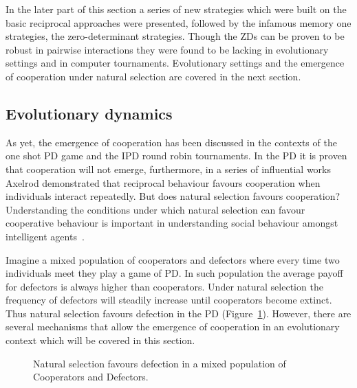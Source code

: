 \documentclass{article}
\theoremstyle{definition}
\begin{document}
In the later part of this section a series of new strategies which were built on
the basic reciprocal approaches were presented, followed by the infamous memory
one strategies, the zero-determinant strategies. Though the ZDs can be proven to be robust
in pairwise interactions they were found to be lacking in evolutionary settings
and in computer tournaments. Evolutionary settings and the emergence
of cooperation under natural selection are covered in the next section.

\subsection{Evolutionary dynamics}\label{subsection:evolutionary_dynamics}

As yet, the emergence of cooperation has been discussed in the contexts of the
one shot PD game and the IPD round robin tournaments. In the PD it is
proven that cooperation will not emerge, furthermore, in a series of influential works
Axelrod demonstrated that reciprocal behaviour favours cooperation when
individuals interact repeatedly. But does natural selection favours cooperation?
Understanding the conditions under which natural selection can favour
cooperative behaviour is important in understanding social behaviour amongst
intelligent agents~\cite{Boyd1987}.

Imagine a mixed population of cooperators and defectors where every
time two individuals meet they play a game of PD. In such population the average
payoff for defectors is always higher than cooperators. Under natural selection
the frequency of defectors will steadily increase until cooperators become
extinct. Thus natural selection favours defection in the PD
(Figure~\ref{fig:natural_selection_diagram}). However, there are several mechanisms
that allow the emergence of cooperation in an evolutionary context which will be
covered in this section.

\begin{figure}[!hbtp]
    \centering
    
    \caption{Natural selection favours defection in a mixed population of Cooperators
    and Defectors.}\label{fig:natural_selection_diagram}
\end{figure}
\end{document}
